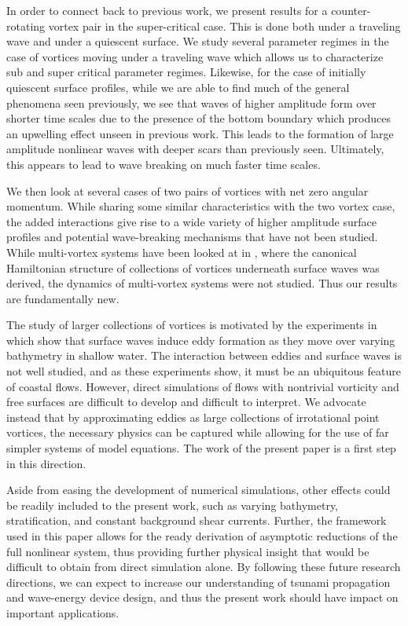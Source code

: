 \documentclass[a4paper,11pt]{article}
\begin{document}
In order to connect back to previous work, we present results for a counter-rotating vortex pair in the super-critical case.  This is done both under a traveling wave and under a quiescent surface.  We study several parameter regimes in the case of vortices moving under a traveling wave which allows us to characterize sub and super critical parameter regimes.  Likewise, for the case of initially quiescent surface profiles, while we are able to find much of the general phenomena seen previously, we see that waves of higher amplitude form over shorter time scales due to the presence of the bottom boundary which produces an upwelling effect unseen in previous work.  This leads to the formation of large amplitude nonlinear waves with deeper scars than previously seen.  Ultimately, this appears to lead to wave breaking on much faster time scales.    

We then look at several cases of two pairs of vortices with net zero angular momentum.  While sharing some similar characteristics with the two vortex case, the added interactions give rise to a wide variety of higher amplitude surface profiles and potential wave-breaking mechanisms that have not been studied.  While multi-vortex systems have been looked at in \cite{rouhi}, where the canonical Hamiltonian structure of collections of vortices underneath surface waves was derived, the dynamics of multi-vortex systems were not studied.  Thus our results are fundamentally new. 

The study of larger collections of vortices is motivated by the experiments in \cite{lin,liu1,liu2} which show that surface waves induce eddy formation as they move over varying bathymetry in shallow water.  The interaction between eddies and surface waves is not well studied, and as these experiments show, it must be an ubiquitous feature of coastal flows.  However, direct simulations of flows with nontrivial vorticity and free surfaces are difficult to develop and difficult to interpret.  We advocate instead that by approximating eddies as large collections of irrotational point vortices, the necessary physics can be captured while allowing for the use of far simpler systems of model equations. The work of the present paper is a first step in this direction.  

Aside from easing the development of numerical simulations, other effects could be readily included to the present work, such as varying bathymetry, stratification, and constant background shear currents.  Further, the framework used in this paper allows for the ready derivation of asymptotic reductions of the full nonlinear system, thus providing further physical insight that would be difficult to obtain from direct simulation alone.  By following these future research directions, we can expect to increase our understanding of tsunami propagation and wave-energy device design, and thus the present work should have impact on important applications.    
\end{document}
